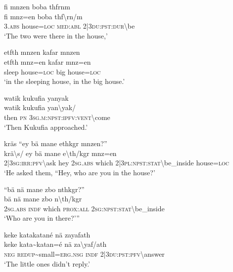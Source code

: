 \ea\label{ex:9:a2258}
fi mnzen boba thfrnm\\
\gll fi	mnz=en	boba	thf{\textbackslash}rn/m\\
     3.\textsc{abs}	house=\textsc{loc}	\textsc{med}:\textsc{abl}	2|3\textsc{du}:\textsc{pst}:\textsc{dur}{\textbackslash}be\\
\glt `The two were there in the house,'
\z

\ea\label{ex:9:a2259}
etfth mnzen kafar mnzen\\
\gll etfth	mnz=en	kafar	mnz=en\\
     sleep	house=\textsc{loc}	big	house=\textsc{loc}\\
\glt `in the sleeping house, in the big house.'
\z

\ea\label{ex:9:a2260}
watik kukufia yanyak\\
\gll watik	kukufia	yan{\textbackslash}yak/\\
     then	\textsc{pn}	3\textsc{sg}.\textsc{m}:\textsc{npst}:\textsc{ipfv}:\textsc{vent}{\textbackslash}come\\
\glt `Then Kukufia approached.'
\z

\ea\label{ex:9:a2261}
kräs ``ey bä mane ethkgr mnzen?''\\
\gll krä{\textbackslash}s/	ey	bä	mane	e{\textbackslash}th/kgr	mnz=en\\
     2|3\textsc{sg}:\textsc{irr}:\textsc{pfv}{\textbackslash}ask	hey	2\textsc{sg}.\textsc{abs}	which	2|3\textsc{pl}:\textsc{npst}:\textsc{stat}{\textbackslash}be\_inside	house=\textsc{loc}\\
\glt `He asked them, ``Hey, who are you in the house?'
\z

\ea\label{ex:9:a2262}
``bä nä mane zbo nthkgr?''\\
\gll bä	nä	mane	zbo	n{\textbackslash}th/kgr\\
     2\textsc{sg}.\textsc{abs}	\textsc{indf}	which	\textsc{prox}:\textsc{all}	2\textsc{sg}:\textsc{npst}:\textsc{stat}{\textbackslash}be\_inside\\
\glt `Who are you in there?'''
\z

\ea\label{ex:9:a2263}
keke katakatané nä zayafath\\
\gll keke	kata{\textasciitilde}katan=é	nä	za{\textbackslash}yaf/ath\\
     \textsc{neg}	\textsc{redup}{\textasciitilde}small=\textsc{erg}.\textsc{nsg}	\textsc{indf}	2|3\textsc{du}:\textsc{pst}:\textsc{pfv}{\textbackslash}answer\\
\glt `The little ones didn't reply.'
\z

